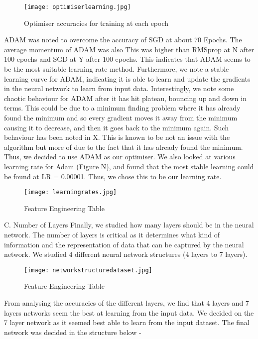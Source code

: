\documentclass{article}
\begin{document}
\begin{figure}[H]
\texttt{[image: optimiserlearning.jpg]}
\centering
\caption{Optimiser accuracies for training at each epoch}
\end{figure}

ADAM was noted to overcome the accuracy of SGD at about 70 Epochs. The average momentum of ADAM was also This was higher than RMSprop at N after 100 epochs and SGD at Y after 100 epochs. This indicates that ADAM seems to be the most suitable learning rate method. Furthermore, we note a stable learning curve for ADAM, indicating it is able to learn and update the gradients in the neural network to learn from input data. Interestingly, we note some chaotic behaviour for ADAM after it has hit plateau, bouncing up and down in terms. This could be due to a minimum finding problem where it has already found the minimum and so every gradient moves it away from the minimum causing it to decrease, and then it goes back to the minimum again. Such behaviour has been noted in X. This is known to be not an issue with the algorithm but more of due to the fact that it has already found the minimum. Thus, we decided to use ADAM as our optimiser. We also looked at various learning rate for Adam (Figure N), and found that the most stable learning could be found at LR = 0.00001. Thus, we chose this to be our learning rate.


\begin{figure}[H]
\caption{Feature Engineering Table}
\texttt{[image: learningrates.jpg]}
\centering
\end{figure}


C. Number of Layers 
Finally, we studied how many layers should be in the neural network. The number of layers is critical as it determines what kind of information and the representation of data that can be captured by the neural network. We studied 4 different neural network structures (4 layers to 7 layers). 

\begin{figure}[H]
\caption{Feature Engineering Table}
\texttt{[image: networkstructuredataset.jpg]}
\centering
\end{figure}

From analysing the accuracies of the different layers, we find that 4 layers and 7 layers networks seem the best at learning from the input data. We decided on the 7 layer network as it seemed best able to learn from the input dataset. The final network was decided in the structure below - 
\end{document}

